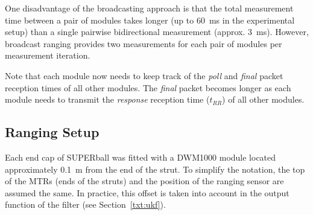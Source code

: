One disadvantage of the broadcasting approach is that the total measurement time between a pair of modules takes longer (up to \SI{60}{\milli\second} in the experimental setup)
 than a single pairwise bidirectional measurement (approx. \SI{3}{\milli\second}).
However, broadcast ranging provides two measurements for each pair of modules per measurement iteration.

Note that each module now needs to keep track of the \emph{poll} and \emph{final} packet reception times of all other modules.
The \emph{final} packet becomes longer as each module needs to transmit the \emph{response} reception time ($t_{RR}$)  of all other modules.


{%






\subsection{Ranging Setup}
Each end cap of SUPERball was fitted with a DWM1000 module located approximately \SI{0.1}{\metre} from the end of the strut.
To simplify the notation, the top of the MTRs (ends of the struts) and the position of the ranging sensor are assumed the same.
In practice, this offset is taken into account in the output function of the filter (see Section~\ref{txt:ukf}).

}
